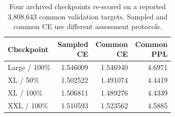 \begin{table}[tbp]
\centering\small
\caption{Four archived checkpoints re-scored on a reported 3,808,643 common validation targets. Sampled and common CE use different assessment protocols.}
\label{tab:audit2}
\begin{tabular}{lrrr}
\toprule
Checkpoint & \shortstack{Sampled\\CE} & \shortstack{Common\\CE} & \shortstack{Common\\PPL}\\
\midrule
Large / 100\% & 1.546009 & 1.546940 & 4.6971\\
XL / 50\% & 1.502522 & 1.491074 & 4.4419\\
XL / 100\% & 1.506811 & 1.489276 & 4.4339\\
XXL / 100\% & 1.510593 & 1.523562 & 4.5885\\
\bottomrule
\end{tabular}
\end{table}
